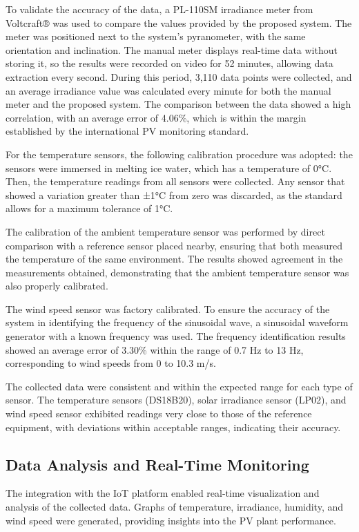 \documentclass{ieeeaccess}
\begin{document}
To validate the accuracy of the data, a PL-110SM irradiance meter from Voltcraft® was used to compare the values provided by the proposed system. The meter was positioned next to the system's pyranometer, with the same orientation and inclination. The manual meter displays real-time data without storing it, so the results were recorded on video for 52 minutes, allowing data extraction every second. During this period, 3,110 data points were collected, and an average irradiance value was calculated every minute for both the manual meter and the proposed system. The comparison between the data showed a high correlation, with an average error of 4.06\%, which is within the margin established by the international PV monitoring standard.

For the temperature sensors, the following calibration procedure was adopted: the sensors were immersed in melting ice water, which has a temperature of 0°C. Then, the temperature readings from all sensors were collected. Any sensor that showed a variation greater than ±1°C from zero was discarded, as the standard allows for a maximum tolerance of 1°C.

The calibration of the ambient temperature sensor was performed by direct comparison with a reference sensor placed nearby, ensuring that both measured the temperature of the same environment. The results showed agreement in the measurements obtained, demonstrating that the ambient temperature sensor was also properly calibrated.


The wind speed sensor was factory calibrated. To ensure the accuracy of the system in identifying the frequency of the sinusoidal wave, a sinusoidal waveform generator with a known frequency was used. The frequency identification results showed an average error of 3.30\% within the range of 0.7 Hz to 13 Hz, corresponding to wind speeds from 0 to 10.3 m/s.

The collected data were consistent and within the expected range for each type of sensor. The temperature sensors (DS18B20), solar irradiance sensor (LP02), and wind speed sensor exhibited readings very close to those of the reference equipment, with deviations within acceptable ranges, indicating their accuracy.

\subsection{Data Analysis and Real-Time Monitoring}

The integration with the IoT platform enabled real-time visualization and analysis of the collected data. Graphs of temperature, irradiance, humidity, and wind speed were generated, providing insights into the PV plant performance.
\end{document}
